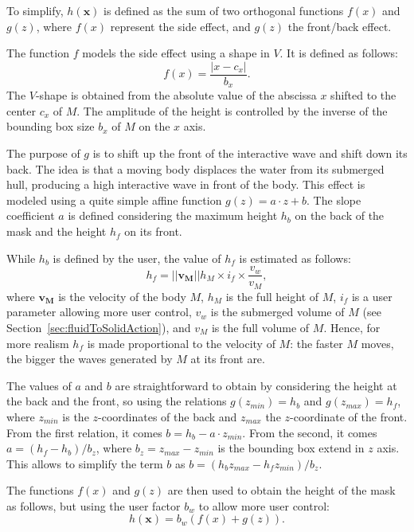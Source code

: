 \documentclass[final]{jcgt}
\begin{document}
To simplify, $h(\mathbf x)$ is defined as the sum of two orthogonal functions $f(x)$ and $g(z)$,
where $f(x)$ represent the side effect, and $g(z)$ the front/back effect.

The function $f$ models the side effect using a shape in $V$.
It is defined as follows:
\begin{equation}
	f(x) = \frac{\left|x-c_x\right|}{b_x}.
\end{equation}
The $V$-shape is obtained from the absolute value of the abscissa $x$ shifted to the center $c_x$ of $M$.
The amplitude of the height is controlled by the inverse of the bounding box size $b_x$ of $M$ on the $x$ axis.

The purpose of $g$ is to shift up the front of the interactive wave and shift down its back.
The idea is that a moving body displaces the water from its submerged hull, producing a high interactive wave in front of the body.
This effect is modeled using a quite simple affine function $g(z)=a\cdot z+b$.
The slope coefficient $a$ is defined considering the maximum height $h_b$ on the back of the mask and the height $h_f$ on its front.

While $h_b$ is defined by the user, the value of $h_f$ is estimated as follows:
\begin{equation}
	h_f = ||\mathbf{v_M}||h_{M}\times i_f\times\frac{v_w}{v_{M}},
\end{equation}
where $\mathbf{v_M}$ is the velocity of the body $M$, $h_M$ is the full height of $M$, $i_f$ is a user parameter allowing more user control, $v_w$ is the submerged volume of $M$ (see Section~\ref{sec:fluidToSolidAction}), and $v_{M}$ is the full volume of $M$.
Hence, for more realism $h_f$ is made proportional to the velocity of $M$:
the faster $M$ moves, the bigger the waves generated by $M$ at its front are.

The values of $a$ and $b$ are straightforward to obtain by considering the height at the back and the front, so using the relations $g(z_{min})=h_b$ and $g(z_{max})=h_f$,
where $z_{min}$ is the $z$-coordinates of the back and $z_{max}$ the $z$-coordinate of the front.
From the first relation, it comes $b=h_b-a\cdot z_{min}$.
From the second, it comes $a=\left(h_f-h_b\right)/b_z$, where $b_z=z_{max}-z_{min}$ is the bounding box extend in $z$ axis.
This allows to simplify the term $b$ as $b=\left(h_bz_{max}-h_fz_{min}\right)/b_z$.

The functions $f(x)$ and $g(z)$ are then used to obtain the height of the mask as follows,
but using the user factor $b_w$ to allow more user control:
\begin{equation}
	\label{equa:mask_full}
	h(\mathbf x)=b_w\left(f(x)+g(z)\right).
\end{equation}
\end{document}
